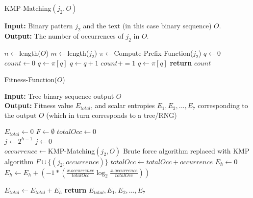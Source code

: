 \documentclass[a4paper,10.5pt]{article}
\begin{document}
\begin{algorithm}[H]
  \caption{KMP-Matching$(j_2, O)$}
  \textbf{Input:} Binary pattern $j_2$ and the text (in this case binary sequence) $O$.\\
  \textbf{Output:} The number of occurrences of $j_2$ in $O$.\\
  \begin{algorithmic}[1]
  	\State $n \gets $length($O$)
	\State $m \gets $length($j_2$)
	\State $\pi \gets $Compute-Prefix-Function($j_2$)
	\State $q \gets 0$
	\State $count \gets 0$
			\State $q \gets \pi[q]$ 
		\EndWhile
			\State $q \gets q + 1$
		\EndIf
		 
			\State $count += 1$ 
			\State $q \gets \pi[q]$
		\EndIf
	\EndFor
	\State \textbf{return} $count$		 

  \end{algorithmic}
\label{kmpalgo}
\end{algorithm}

\begin{algorithm}[H]
  \caption{Fitness-Function($O$)}
  \textbf{Input:} Tree binary sequence output $O$\\
  \textbf{Output:} Fitness value $E_{total}$, and scalar entropies $E_1, E_2, ..., E_7$ corresponding to the output $O$ (which in turn corresponds to a tree/RNG)\\ 
  \begin{algorithmic}[1]
   
   \State $E_{total} \gets 0$
    
	\State $F \gets \emptyset$
	\State $totalOcc \gets 0$\\
	\State $j \gets 2^{h-1}$ 
	 
		\State $j \gets 0$
	\EndIf\\
	 
			\State $occurrence \gets $KMP-Matching$(j_2, O)$  \Comment Brute force algorithm replaced with KMP algorithm
		\State $F \cup \{(j_2, occurrence)\}$ 
		\State $totalOcc \gets totalOcc + occurrence$
	\EndFor
	\State $E_h \gets 0$ 
		\State $E_h \gets E_h + \left(-1 * \left( \frac{x.occurrence}{totalOcc} \log_2 \frac{x.occurrence}{totalOcc}\right)\right) $	
	\EndFor

	\State $E_{total} \gets E_{total} + E_h$
    \EndFor
    \State \textbf{return} $E_{total}, E_1, E_2, ..., E_7$
  \end{algorithmic}
\label{fitnessfunc}
\end{algorithm}
\end{document}
